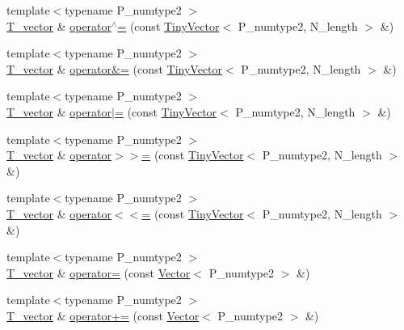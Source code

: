 \begin{DoxyCompactItemize}
\item 
{\footnotesize template$<$typename P\+\_\+numtype2 $>$ }\\\hyperlink{classTinyVector_aea08e4463006acf6842a93c026b27094}{T\+\_\+vector} \& \hyperlink{classTinyVector_a0f857f595581c6b1b4440ac91abe86e1}{operator$^\wedge$=} (const \hyperlink{classTinyVector}{Tiny\+Vector}$<$ P\+\_\+numtype2, N\+\_\+length $>$ \&)
\item 
{\footnotesize template$<$typename P\+\_\+numtype2 $>$ }\\\hyperlink{classTinyVector_aea08e4463006acf6842a93c026b27094}{T\+\_\+vector} \& \hyperlink{classTinyVector_a4aa5b32c84b22b7d5217533c569ef7a1}{operator\&=} (const \hyperlink{classTinyVector}{Tiny\+Vector}$<$ P\+\_\+numtype2, N\+\_\+length $>$ \&)
\item 
{\footnotesize template$<$typename P\+\_\+numtype2 $>$ }\\\hyperlink{classTinyVector_aea08e4463006acf6842a93c026b27094}{T\+\_\+vector} \& \hyperlink{classTinyVector_abecdcc06c7012c2901522a0b7ee4f6c0}{operator$\vert$=} (const \hyperlink{classTinyVector}{Tiny\+Vector}$<$ P\+\_\+numtype2, N\+\_\+length $>$ \&)
\item 
{\footnotesize template$<$typename P\+\_\+numtype2 $>$ }\\\hyperlink{classTinyVector_aea08e4463006acf6842a93c026b27094}{T\+\_\+vector} \& \hyperlink{classTinyVector_aec8118d72a08262563a4b1dabf6008aa}{operator$>$$>$=} (const \hyperlink{classTinyVector}{Tiny\+Vector}$<$ P\+\_\+numtype2, N\+\_\+length $>$ \&)
\item 
{\footnotesize template$<$typename P\+\_\+numtype2 $>$ }\\\hyperlink{classTinyVector_aea08e4463006acf6842a93c026b27094}{T\+\_\+vector} \& \hyperlink{classTinyVector_ac90ddfa5fd8032dcb72cd6304d43fb22}{operator$<$$<$=} (const \hyperlink{classTinyVector}{Tiny\+Vector}$<$ P\+\_\+numtype2, N\+\_\+length $>$ \&)
\item 
{\footnotesize template$<$typename P\+\_\+numtype2 $>$ }\\\hyperlink{classTinyVector_aea08e4463006acf6842a93c026b27094}{T\+\_\+vector} \& \hyperlink{classTinyVector_af08cc2ad2507596359f33d7291629e07}{operator=} (const \hyperlink{classVector}{Vector}$<$ P\+\_\+numtype2 $>$ \&)
\item 
{\footnotesize template$<$typename P\+\_\+numtype2 $>$ }\\\hyperlink{classTinyVector_aea08e4463006acf6842a93c026b27094}{T\+\_\+vector} \& \hyperlink{classTinyVector_ac8d9c21e280c6d18fc8cea068e0acfa7}{operator+=} (const \hyperlink{classVector}{Vector}$<$ P\+\_\+numtype2 $>$ \&)

\end{DoxyCompactItemize}
